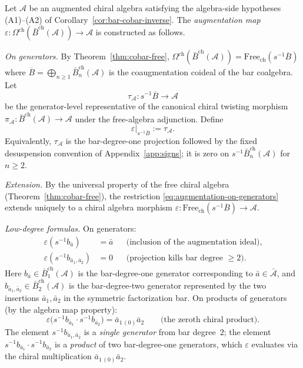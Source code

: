 \begin{proposition}
\label{prop:cobar-bar-augmentation}
Let $\mathcal{A}$ be an augmented chiral algebra satisfying the
algebra-side hypotheses (A1)--(A2) of
Corollary~\ref{cor:bar-cobar-inverse}.
The \emph{augmentation map}
$\varepsilon\colon
\Omega^{\mathrm{ch}}(\bar{B}^{\mathrm{ch}}(\mathcal{A}))
\to \mathcal{A}$
is constructed as follows.

\emph{On generators.}
By Theorem~\ref{thm:cobar-free},
$\Omega^{\mathrm{ch}}(\bar{B}^{\mathrm{ch}}(\mathcal{A}))
= \mathrm{Free}_{\mathrm{ch}}(s^{-1}\overline{B})$
where $\overline{B} = \bigoplus_{n \geq 1}
\bar{B}^{\mathrm{ch}}_n(\mathcal{A})$ is the coaugmentation
coideal of the bar coalgebra.
Let
\[
\tau_{\mathcal A}\colon s^{-1}\overline B\longrightarrow \mathcal A
\]
be the generator-level representative of the canonical chiral
twisting morphism
$\pi_{\mathcal A}\colon\bar B^{\mathrm{ch}}(\mathcal A)\to\mathcal A$
under the free-algebra adjunction. Define
\begin{equation}\label{eq:augmentation-on-generators}
\varepsilon|_{s^{-1}\overline B}:=\tau_{\mathcal A}.
\end{equation}
Equivalently, $\tau_{\mathcal A}$ is the bar-degree-one projection
followed by the fixed desuspension convention of
Appendix~\ref{app:signs}; it is zero on
$s^{-1}\bar B^{\mathrm{ch}}_n(\mathcal A)$ for $n\geq2$.

\emph{Extension.}
By the universal property of the free chiral algebra
(Theorem~\ref{thm:cobar-free}), the restriction
\eqref{eq:augmentation-on-generators} extends uniquely to a
chiral algebra morphism
$\varepsilon\colon
\mathrm{Free}_{\mathrm{ch}}(s^{-1}\overline{B}) \to \mathcal{A}$.

\emph{Low-degree formulas.}
On generators:
\begin{align}
\varepsilon(s^{-1}b_{\bar a}) &= \bar{a}
 &&\text{(inclusion of the augmentation ideal),}
 \label{eq:aug-degree-1} \\
\varepsilon(s^{-1}b_{\bar a_1,\bar a_2}) &= 0
 &&\text{(projection kills bar degree $\geq 2$).}
 \label{eq:aug-degree-2-gen}
\end{align}
Here $b_{\bar a}\in\bar B^{\mathrm{ch}}_1(\mathcal A)$ is the
bar-degree-one generator corresponding to
$\bar a\in\bar{\mathcal A}$, and
$b_{\bar a_1,\bar a_2}\in\bar B^{\mathrm{ch}}_2(\mathcal A)$ is the
bar-degree-two generator represented by the two insertions
$\bar a_1,\bar a_2$ in the symmetric factorization bar.
On products of generators (by the algebra map property):
\begin{equation}\label{eq:aug-product}
\varepsilon\bigl(s^{-1}b_{\bar a_1}
 \cdot s^{-1}b_{\bar a_2}\bigr)
= \bar{a}_{1\,(0)}\bar{a}_2
\qquad\text{(the zeroth chiral product).}
\end{equation}
The element $s^{-1}b_{\bar a_1,\bar a_2}$ is a \emph{single
generator} from bar degree~$2$; the element
$s^{-1}b_{\bar a_1}\cdot s^{-1}b_{\bar a_2}$ is a
\emph{product} of two bar-degree-one generators, which
$\varepsilon$ evaluates via the chiral multiplication
$\bar{a}_{1\,(0)}\bar{a}_2$.
\end{proposition}

